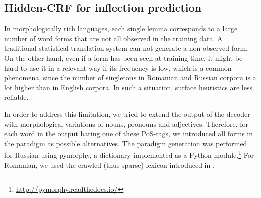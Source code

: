 \documentclass[11pt]{article}
\newcommand{\soul}{\textsc{SOUL}\xspace}
\begin{document}


\subsection{Hidden-CRF for inflection prediction}

In morphologically rich languages, each single lemma corresponds to
a large number of word forms that are not all observed
in the training data. A traditional statistical translation
system can not generate a non-observed form. On the other hand,
even if a form has been seen at training time, it might be hard
to use it in a relevant way if its frequency is low, which is
a common phenomena, since the number of singletons in Romanian and Russian
corpora is a lot higher than in English corpora. In such a situation,
surface heuristics are less reliable.

In order to address this limitation, we tried to extend the output of the
decoder with morphological variations of nouns, pronouns and adjectives.
Therefore, for each word in the output baring one of these PoS-tags,
we introduced all forms in the paradigm as possible alternatives.
The paradigm generation was performed for Russian using pymorphy, a dictionary
implemented as a Python module.\footnote{\url{http://pymorphy.readthedocs.io/}}
For Romanian, we used the crawled (thus sparse) lexicon introduced in \cite{capitaine_aufranescu}.
\end{document}
